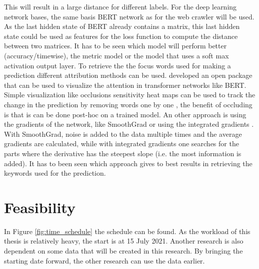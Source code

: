 \documentclass{article}
\begin{document}
This will result in a large distance for different labels.
For the deep learning network bases, the same basis BERT network as for the web crawler will be used.
As the last hidden state of BERT already contains a matrix, this last hidden state could be used as features for the loss function to compute the distance between two matrices.
It has to be seen which model will perform better (accuracy/timewise), the metric model or the model that uses a soft max activation output layer. 
To retrieve the the focus words used for making a prediction different attribution methods can be used.
\textcite{vig_multiscale_2019} developed an open package that can be used to visualize the attention in transformer networks like BERT.
Simple visualization like occlusions sensitivity heat maps can be used to track the change in the prediction by removing words one by one \autocite{fleet_visualizing_2014}, the benefit of occluding is that is can be done post-hoc on a trained model.
An other approach is using the gradients of the network, like SmoothGrad \autocite{smilkov_smoothgrad_2017} or using the integrated gradients \autocite{sundararajan_axiomatic_2017}.
With SmoothGrad, noise is added to the data multiple times and the average gradients are calculated, while with integrated gradients one searches for the parts where the derivative has the steepest slope (i.e. the most information is added).
It has to been seen which approach gives to best results in retrieving the keywords used for the prediction.

\section{Feasibility}
In Figure \ref{fig:time_schedule} the schedule can be found. 
As the workload of this thesis is relatively heavy, the start is at 15 July 2021.
Another research is also dependent on some data that will be created in this research.
By bringing the starting date forward, the other research can use the data earlier.
\end{document}
